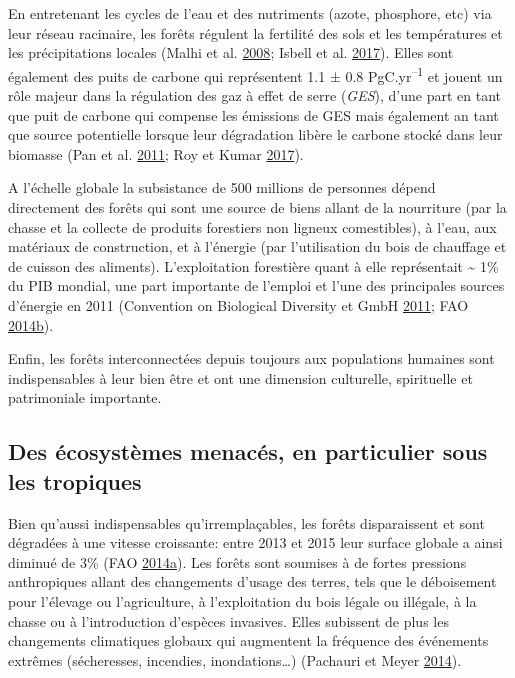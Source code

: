 \documentclass[11pt,french,A4paper,extrafontsizes,onecolumn,openright]{memoir}
\begin{document}
En entretenant les cycles de l'eau et des nutriments (azote, phosphore,
etc) via leur réseau racinaire, les forêts régulent la fertilité des
sols et les températures et les précipitations locales (Malhi et al.
\protect\hyperlink{ref-Malhi2008}{2008}; Isbell et al.
\protect\hyperlink{ref-Isbell2017}{2017}). Elles sont également des
puits de carbone qui représentent 1.1 ± 0.8 PgC.yr\textsuperscript{--1}
et jouent un rôle majeur dans la régulation des gaz à effet de serre
(\emph{GES}), d'une part en tant que puit de carbone qui compense les
émissions de GES mais également an tant que source potentielle lorsque
leur dégradation libère le carbone stocké dans leur biomasse (Pan et al.
\protect\hyperlink{ref-Pan2011}{2011}; Roy et Kumar
\protect\hyperlink{ref-Roy2017}{2017}).

A l'échelle globale la subsistance de 500 millions de personnes dépend
directement des forêts qui sont une source de biens allant de la
nourriture (par la chasse et la collecte de produits forestiers non
ligneux comestibles), à l'eau, aux matériaux de construction, et à
l'énergie (par l'utilisation du bois de chauffage et de cuisson des
aliments). L'exploitation forestière quant à elle représentait
\textasciitilde{} 1\% du PIB mondial, une part importante de l'emploi et
l'une des principales sources d'énergie en 2011 (Convention on
Biological Diversity et GmbH
\protect\hyperlink{ref-CBDdiversity2011}{2011}; FAO
\protect\hyperlink{ref-FAO2014}{2014}\protect\hyperlink{ref-FAO2014}{b}).

Enfin, les forêts interconnectées depuis toujours aux populations
humaines sont indispensables à leur bien être et ont une dimension
culturelle, spirituelle et patrimoniale importante.

\subsection{Des écosystèmes menacés, en particulier sous les
tropiques}\label{des-ecosystemes-menaces-en-particulier-sous-les-tropiques}

Bien qu'aussi indispensables qu'irremplaçables, les forêts disparaissent
et sont dégradées à une vitesse croissante: entre 2013 et 2015 leur
surface globale a ainsi diminué de 3\% (FAO
\protect\hyperlink{ref-FAO2009}{2014}\protect\hyperlink{ref-FAO2009}{a}).
Les forêts sont soumises à de fortes pressions anthropiques allant des
changements d'usage des terres, tels que le déboisement pour l'élevage
ou l'agriculture, à l'exploitation du bois légale ou illégale, à la
chasse ou à l'introduction d'espèces invasives. Elles subissent de plus
les changements climatiques globaux qui augmentent la fréquence des
événements extrêmes (sécheresses, incendies, inondations\ldots{})
(Pachauri et Meyer \protect\hyperlink{ref-Pachauri2014}{2014}).
\end{document}
